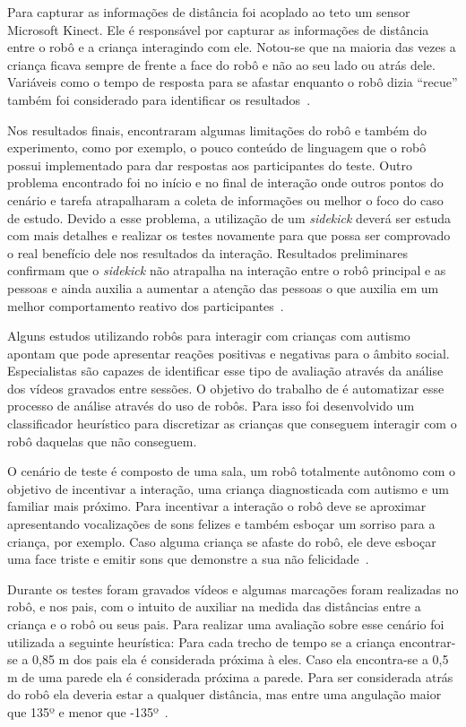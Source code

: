 Para capturar as informações de distância foi acoplado ao teto um sensor Microsoft Kinect. Ele é responsável por capturar as informações de distância entre o robô e a criança interagindo com ele. Notou-se que na maioria das vezes a criança ficava sempre de frente a face do robô e não ao seu lado ou atrás dele. Variáveis como o tempo de resposta para se afastar enquanto o robô dizia ``recue'' também foi considerado para identificar os resultados~\cite{Vazquez:2014}.

Nos resultados finais,  encontraram algumas limitações do robô e também do experimento, como por exemplo, o pouco conteúdo de linguagem que o robô possui implementado para dar respostas aos participantes do teste. Outro problema encontrado foi no início e no final de interação onde outros pontos do cenário e tarefa atrapalharam a coleta de informações ou melhor o foco do caso de estudo. Devido a esse problema, a utilização de um \emph{sidekick} deverá ser estuda com mais detalhes e realizar os testes novamente para que possa ser comprovado o real benefício dele nos resultados da interação. Resultados preliminares confirmam que o \emph{sidekick} não atrapalha na interação entre o robô principal e as pessoas e ainda auxilia a aumentar a atenção das pessoas o que auxilia em um melhor comportamento reativo dos participantes~\cite{Vazquez:2014}.

Alguns estudos utilizando robôs para interagir com crianças com autismo apontam que pode apresentar reações positivas e negativas para o âmbito social. Especialistas são capazes de identificar esse tipo de avaliação através da análise dos vídeos gravados entre sessões. O objetivo do trabalho de  é automatizar esse processo de análise através do uso de robôs. Para isso foi desenvolvido um classificador heurístico para discretizar as crianças que conseguem interagir com o robô daquelas que não conseguem.

O cenário de teste é composto de uma sala, um robô totalmente autônomo com o objetivo de incentivar a interação, uma criança diagnosticada com autismo e um familiar mais próximo. Para incentivar a interação o robô deve se aproximar apresentando vocalizações de sons felizes e também esboçar um sorriso para a criança, por exemplo. Caso alguma criança se afaste do robô, ele deve esboçar uma face triste e emitir sons que demonstre a sua não felicidade~\cite{Feil-Seifer:2010}.

Durante os testes foram gravados vídeos e algumas marcações foram realizadas no robô, e nos pais, com o intuito de auxiliar na medida das distâncias entre a criança e o robô ou seus pais. Para realizar uma avaliação sobre esse cenário foi utilizada a seguinte heurística: Para cada trecho de tempo se a criança encontrar-se a 0,85 m dos pais ela é considerada próxima à eles. Caso ela encontra-se a 0,5 m de uma parede ela é considerada próxima a parede. Para ser considerada atrás do robô ela deveria estar a qualquer distância, mas entre uma angulação maior que 135º e menor que -135º~\cite{Feil-Seifer:2010}.

